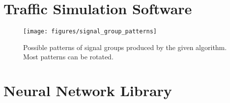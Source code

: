 \section{Traffic Simulation Software}

\begin{figure}[ht]
	\centering
	\texttt{[image: figures/signal\_group\_patterns]}
	\caption{Possible patterns of signal groups produced by the given algorithm. Most patterns can be rotated.}
	\label{signal_group_pattern}
\end{figure}

\section{Neural Network Library}
